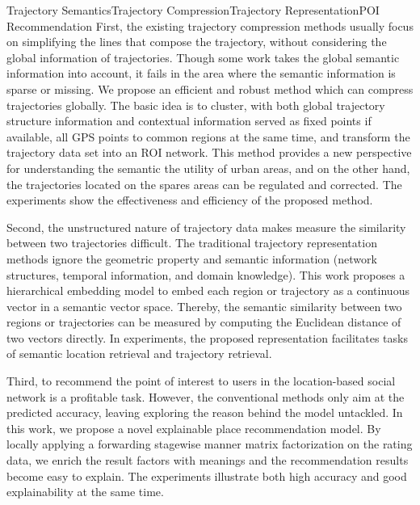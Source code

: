 \begin{Eabstract}{Trajectory Semantics}{Trajectory Compression}{Trajectory Representation}{POI Recommendation}{}
First, the existing trajectory compression methods usually focus on simplifying the lines that compose the trajectory, without considering the global information of trajectories. Though some work takes the global semantic information into account, it fails in the area where the semantic information is sparse or missing. We propose an efficient and robust method which can compress trajectories globally. The basic idea is to cluster, with both global trajectory structure information and contextual information served as fixed points if available, all GPS points to common regions at the same time, and transform the trajectory data set into an ROI network. This method provides a new perspective for understanding the semantic the utility of urban areas, and on the other hand, the trajectories located on the spares areas can be regulated and corrected. The experiments show the effectiveness and efficiency of the proposed method.

Second, the unstructured nature of trajectory data makes measure the similarity between two trajectories difficult. The traditional trajectory representation methods ignore the geometric property and semantic information (network structures, temporal information, and domain knowledge). This work proposes a hierarchical embedding model to embed each region or trajectory as a continuous vector in a semantic vector space. Thereby, the semantic similarity between two regions or trajectories can be measured by computing the Euclidean distance of two vectors directly. In experiments, the proposed representation facilitates tasks of semantic location retrieval and trajectory retrieval.

Third, to recommend the point of interest to users in the location-based social network is a profitable task. However, the conventional methods only aim at the predicted accuracy, leaving exploring the reason behind the model untackled. In this work, we propose a novel explainable place recommendation model. By locally applying a forwarding stagewise manner matrix factorization on the rating data, we enrich the result factors with meanings and the recommendation results become easy to explain. The experiments illustrate both high accuracy and good explainability at the same time.
\end{Eabstract}
